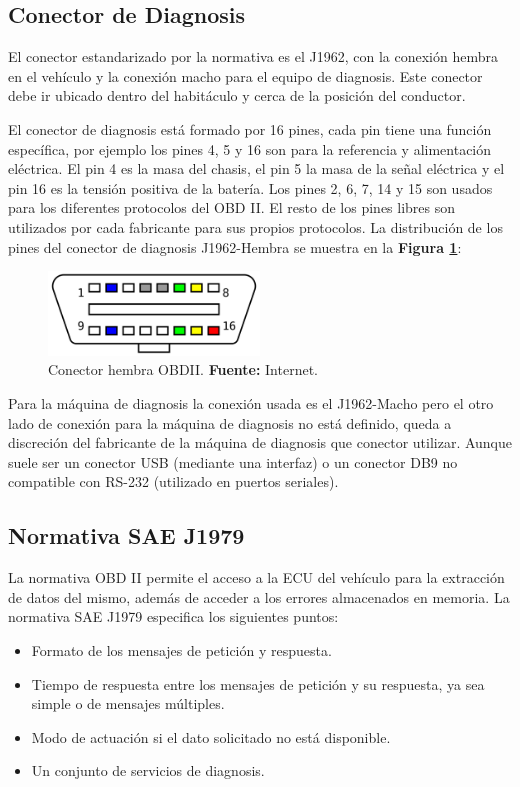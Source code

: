 \subsection{Conector de Diagnosis}

El conector estandarizado por la normativa es el J1962, con la conexión hembra en el vehículo y la conexión macho para el equipo de diagnosis. Este conector debe ir ubicado dentro del habitáculo y cerca de la posición del conductor.

El conector de diagnosis está formado por 16 pines, cada pin tiene una función específica, por ejemplo los pines 4, 5 y 16 son para la referencia y alimentación eléctrica. El pin 4 es la masa del chasis, el pin 5 la masa de la señal eléctrica y el pin 16 es la tensión positiva de la batería. Los pines 2, 6, 7, 14 y 15 son usados para los diferentes protocolos del OBD II. El resto de los pines libres son utilizados por cada fabricante para sus propios protocolos.  La distribución de los pines del conector de diagnosis J1962-Hembra se muestra en la \textbf{Figura \ref{OB}}:

\begin{figure}[H]
	\centering
		\includegraphics[width=0.5\textwidth]{./Cap3imagen/OBD_connector.png}
	\caption[Segmento del tiempo de un bit.]{Conector hembra OBDII.\textbf{ Fuente:} Internet.}
	\label{OB} %
\end{figure}

Para la máquina de diagnosis la conexión usada es el J1962-Macho pero el otro lado de conexión para la máquina de diagnosis no está definido, queda a discreción del fabricante de la máquina de diagnosis que conector utilizar.  Aunque suele ser un conector USB (mediante una interfaz) o un conector DB9 no compatible con RS-232 (utilizado en puertos seriales). 


\subsection{Normativa SAE J1979}

La normativa OBD II permite el acceso a la ECU del vehículo para la extracción de datos del mismo, además de acceder a los errores almacenados en memoria.
La normativa SAE J1979 especifica los siguientes puntos:
\begin{itemize}
\item Formato de los mensajes de petición y respuesta.
\item Tiempo de respuesta entre los mensajes de petición y su respuesta, ya sea simple o de mensajes múltiples.
\item Modo de actuación si el dato solicitado no está disponible.
\item Un conjunto de servicios de diagnosis.
\end{itemize}

